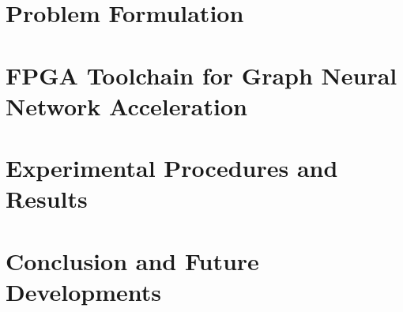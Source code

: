 \documentclass{Configuration_Files/PoliMi3i_thesis}
\begin{document}


    \chapter{Problem Formulation}
    \label{ch:chapter_four}%
    



    \chapter{FPGA Toolchain for Graph Neural Network Acceleration}
    \label{ch:chapter_five}%
    





    \chapter{Experimental Procedures and Results}
    \label{ch:chapter_six}%
    




    \chapter{Conclusion and Future Developments}
    \label{ch:conclusions}%
    


\end{document}
